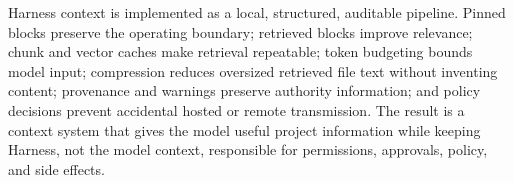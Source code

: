 \documentclass[11pt]{article}
\begin{document}
Harness context is implemented as a local, structured, auditable pipeline. Pinned blocks preserve the operating boundary; retrieved blocks improve relevance; chunk and vector caches make retrieval repeatable; token budgeting bounds model input; compression reduces oversized retrieved file text without inventing content; provenance and warnings preserve authority information; and policy decisions prevent accidental hosted or remote transmission. The result is a context system that gives the model useful project information while keeping Harness, not the model context, responsible for permissions, approvals, policy, and side effects.
\end{document}
